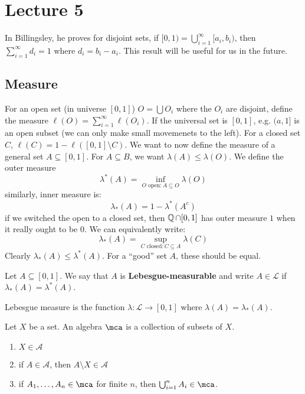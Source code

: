 \section{Lecture 5}
In Billingsley, he proves for disjoint sets, if $[0, 1) = \bigcup_{i = 1}^{\infty} [a_i, b_i)$,
then $\sum_{i = 1}^{\infty} d_i = 1$ where $d_i = b_i - a_i$. This result will be useful for us in the future.
\subsection{Measure}
For an open set (in universe $[0, 1]$) $O = \bigcup O_i$ where the $O_i$ are disjoint, define the measure $\ell(O) = \sum_{i = 1}^{\infty} \ell(O_i)$. If the universal
set is $[0, 1]$, e.g. $(a, 1]$ is an open subset (we can only make small movemenets to the left).
For a closed set $C$, $\ell(C) = 1 - \ell([0, 1]\setminus C)$. We want to now define the measure of a general set
$A \subseteq [0, 1]$. For $A \subseteq B$, we want $\lambda(A) \leq \lambda(O)$. We define the outer measure 
\[ \lambda^*(A)  = \inf_{O \text{ open}: A \subseteq O} \lambda(O)\]
similarly, inner measure is:
\[ \lambda_*(A) = 1 - \lambda^*(A^c) \]
if we switched the open to a closed set, then $\operatorname{\mathbb{Q}} \cap [0, 1]$ has outer measure $1$ when it really ought to be 0.
We can equivalently write:
\[ \lambda_*(A) = \sup_{C \text{ closed}: C \subseteq A} \lambda(C) \]
Clearly $\lambda_*(A) \leq \lambda^*(A)$. For a ``good'' set $A$, these should be equal.
\begin{definition}
    Let $A \subseteq [0, 1]$. We say that $A$ is \textbf{Lebesgue-measurable} and write $A \in \mathcal{L}$ if $\lambda_*(A) = \lambda^*(A)$.
\end{definition}
\begin{definition}
    Lebesgue measure is the function $\lambda: \mathcal{L} \to [0, 1]$ where $\lambda(A) = \lambda_*(A)$.
\end{definition}
\begin{definition}
    Let $X$ be a set. An algebra $\mca$ is a collection of subsets of $X$.
    \begin{enumerate}
        \item $X \in \mathcal{A}$
        \item if $A \in \mathcal{A}$, then $A \setminus X \in \mathcal{A}$
        \item if $A_1, \dots, A_n \in \mca$ for finite $n$, then $\bigcup_{i = 1}^n A_i \in \mca$.
    \end{enumerate}
\end{definition}
